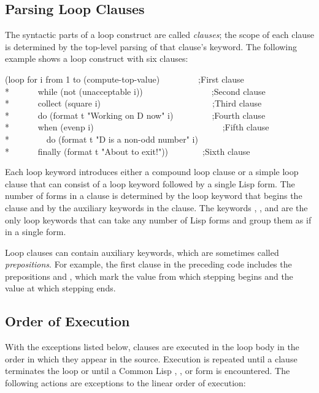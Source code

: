 \begin{new}
  \section{Parsing Loop Clauses}

  The syntactic parts of a loop construct are called {\it clauses}; the scope
  of each clause is determined by the top-level parsing of that clause's
  keyword.  The following example shows a loop construct with six
  clauses:

\begin{lisp}
(loop for i from 1 to (compute-top-value)~~~~~~~~~;{\rm First clause} \\*
~~~~~~while (not (unacceptable i))~~~~~~~~~~~~~~~~;{\rm Second clause} \\*
~~~~~~collect (square i)~~~~~~~~~~~~~~~~~~~~~~~~~~;{\rm Third clause} \\*
~~~~~~do (format t "Working on {\Xtilde}D now" i)~~~~~~~~~;{\rm Fourth clause} \\*
~~~~~~when (evenp i)~~~~~~~~~~~~~~~~~~~~~~~~~~~~~~;{\rm Fifth clause} \\*
~~~~~~~~do (format t "{\Xtilde}D is a non-odd number" i) \\*
~~~~~~finally (format t "About to exit!"))~~~~~~~~;{\rm Sixth clause}
\end{lisp}


  Each loop keyword introduces either a compound loop clause or a simple
  loop clause that can consist of a loop keyword followed by a 
  single Lisp form.  The number of
  forms in a clause is determined by the loop keyword that begins the
  clause and by the auxiliary keywords in the clause.  The keywords
  , , and  are the only loop
  keywords that can take any number of Lisp forms and group them as if
  in a single  form.

  Loop clauses can contain auxiliary keywords, which are sometimes
  called {\it prepositions}.  For example, the first clause in the preceding code
  includes the prepositions  and , which mark
  the value from which stepping begins and the value at which stepping
  ends.

  \subsection{Order of Execution}

  With the exceptions listed below, clauses are executed in the loop body
  in the order in which they appear in the source.  Execution is repeated 
  until a clause
  terminates the loop or until a Common Lisp ,
  , or  form is encountered.  The following actions are
  exceptions to the linear order of execution:


\end{new}
